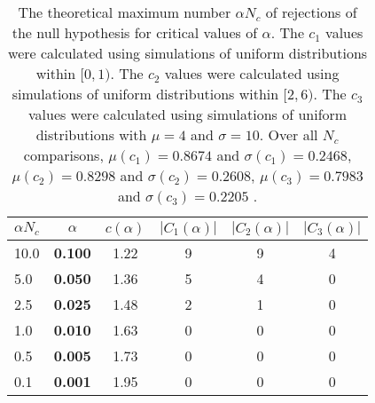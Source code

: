 \begin{table}[h!]
\begin{center}
\begin{tabular}{| l | c | c | c | c | c |}\hline
$\alpha N_c$ & $\alpha$ & $c(\alpha)$ & $|C_1(\alpha)|$ & $|C_2(\alpha)|$ & $|C_3(\alpha)|$ \\\hline\hline
10.0 & {\bf 0.100} & 1.22 & 9 & 9 & 4 \\\hline
5.0 & {\bf 0.050} & 1.36 & 5 & 4 & 0 \\\hline
2.5 & {\bf 0.025} & 1.48 & 2 & 1 & 0 \\\hline
1.0 & {\bf 0.010} & 1.63 & 0 & 0 & 0 \\\hline
0.5 & {\bf 0.005} & 1.73 & 0 & 0 & 0 \\\hline
0.1 & {\bf 0.001} & 1.95 & 0 & 0 & 0 \\\hline
\end{tabular}
\caption{The theoretical maximum number $\alpha N_c$ of rejections
        of the null hypothesis for critical values of $\alpha$.
        The $c_1$ values were calculated using simulations of uniform distributions within $[0,1)$.
        The $c_2$ values were calculated using simulations of uniform distributions within $[2,6)$.
        The $c_3$ values were calculated using simulations of uniform distributions with $\mu=4$ and $\sigma=10$.
        Over all $N_c$ comparisons,
         $\mu(c_1)=0.8674$ and $\sigma(c_1)=0.2468$,
         $\mu(c_2)=0.8298$ and $\sigma(c_2)=0.2608$,
         $\mu(c_3)=0.7983$ and $\sigma(c_3)=0.2205$ .
        }
\end{center}
\end{table}